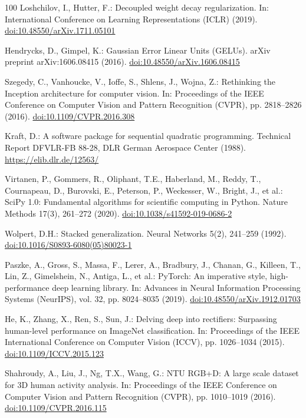 \documentclass[runningheads]{llncs}
\begin{document}
\begin{thebibliography}{100}
Loshchilov, I., Hutter, F.: Decoupled weight decay regularization. In: International Conference on Learning Representations (ICLR) (2019). \href{https://doi.org/10.48550/arXiv.1711.05101}{doi:10.48550/arXiv.1711.05101}

Hendrycks, D., Gimpel, K.: Gaussian Error Linear Units (GELUs). arXiv preprint arXiv:1606.08415 (2016). \href{https://doi.org/10.48550/arXiv.1606.08415}{doi:10.48550/arXiv.1606.08415}

Szegedy, C., Vanhoucke, V., Ioffe, S., Shlens, J., Wojna, Z.: Rethinking the Inception architecture for computer vision. In: Proceedings of the IEEE Conference on Computer Vision and Pattern Recognition (CVPR), pp. 2818--2826 (2016). \href{https://doi.org/10.1109/CVPR.2016.308}{doi:10.1109/CVPR.2016.308}

Kraft, D.: A software package for sequential quadratic programming. Technical Report DFVLR-FB 88-28, DLR German Aerospace Center (1988). \url{https://elib.dlr.de/12563/}

Virtanen, P., Gommers, R., Oliphant, T.E., Haberland, M., Reddy, T., Cournapeau, D., Burovski, E., Peterson, P., Weckesser, W., Bright, J., et al.: SciPy 1.0: Fundamental algorithms for scientific computing in Python. Nature Methods 17(3), 261--272 (2020). \href{https://doi.org/10.1038/s41592-019-0686-2}{doi:10.1038/s41592-019-0686-2}

Wolpert, D.H.: Stacked generalization. Neural Networks 5(2), 241--259 (1992). \href{https://doi.org/10.1016/S0893-6080(05)80023-1}{doi:10.1016/S0893-6080(05)80023-1}

Paszke, A., Gross, S., Massa, F., Lerer, A., Bradbury, J., Chanan, G., Killeen, T., Lin, Z., Gimelshein, N., Antiga, L., et al.: PyTorch: An imperative style, high-performance deep learning library. In: Advances in Neural Information Processing Systems (NeurIPS), vol. 32, pp. 8024--8035 (2019). \href{https://doi.org/10.48550/arXiv.1912.01703}{doi:10.48550/arXiv.1912.01703}

He, K., Zhang, X., Ren, S., Sun, J.: Delving deep into rectifiers: Surpassing human-level performance on ImageNet classification. In: Proceedings of the IEEE International Conference on Computer Vision (ICCV), pp. 1026--1034 (2015). \href{https://doi.org/10.1109/ICCV.2015.123}{doi:10.1109/ICCV.2015.123}

Shahroudy, A., Liu, J., Ng, T.X., Wang, G.: NTU RGB+D: A large scale dataset for 3D human activity analysis. In: Proceedings of the IEEE Conference on Computer Vision and Pattern Recognition (CVPR), pp. 1010--1019 (2016). \href{https://doi.org/10.1109/CVPR.2016.115}{doi:10.1109/CVPR.2016.115}


\end{thebibliography}
\end{document}
